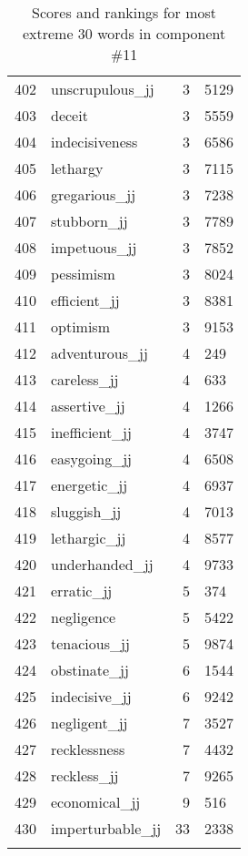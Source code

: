 \begin{longtable}[!htbp]{| rlr@{.}l |}
    402 & unscrupulous\_jj & 3 & 5129 \\
    403 & deceit & 3 & 5559 \\
    404 & indecisiveness & 3 & 6586 \\
    405 & lethargy & 3 & 7115 \\
    406 & gregarious\_jj & 3 & 7238 \\
    407 & stubborn\_jj & 3 & 7789 \\
    408 & impetuous\_jj & 3 & 7852 \\
    409 & pessimism & 3 & 8024 \\
    410 & efficient\_jj & 3 & 8381 \\
    411 & optimism & 3 & 9153 \\
    412 & adventurous\_jj & 4 & 249 \\
    413 & careless\_jj & 4 & 633 \\
    414 & assertive\_jj & 4 & 1266 \\
    415 & inefficient\_jj & 4 & 3747 \\
    416 & easygoing\_jj & 4 & 6508 \\
    417 & energetic\_jj & 4 & 6937 \\
    418 & sluggish\_jj & 4 & 7013 \\
    419 & lethargic\_jj & 4 & 8577 \\
    420 & underhanded\_jj & 4 & 9733 \\
    421 & erratic\_jj & 5 & 374 \\
    422 & negligence & 5 & 5422 \\
    423 & tenacious\_jj & 5 & 9874 \\
    424 & obstinate\_jj & 6 & 1544 \\
    425 & indecisive\_jj & 6 & 9242 \\
    426 & negligent\_jj & 7 & 3527 \\
    427 & recklessness & 7 & 4432 \\
    428 & reckless\_jj & 7 & 9265 \\
    429 & economical\_jj & 9 & 516 \\
    430 & imperturbable\_jj & 33 & 2338 \\
    \hline
    \caption{Scores and rankings for most extreme 30 words in component \#11} \\
\end{longtable}
